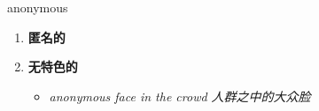 
\begin{frame}
{\huge anonymous}
\begin{center}
\begin{enumerate}\Large
  \item \textbf{匿名的}
  \item \textbf{无特色的}
  \begin{itemize}
    \item \em{\Large{anonymous face in the crowd 人群之中的大众脸}}
  \end{itemize}
\end{enumerate}
\end{center}
\end{frame}

